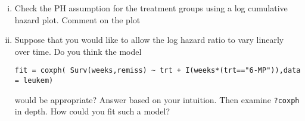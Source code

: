 \begin{enumerate}[(a)]
\begin{enumerate}[(i)]
\item Check the PH assumption for the treatment groups using a log cumulative hazard plot. Comment on the plot
\item Suppose that you would like to allow the log hazard ratio to vary linearly over time. Do you think the model
\begin{small}
\begin{verbatim}
fit = coxph( Surv(weeks,remiss) ~ trt + I(weeks*(trt=="6-MP")),data = leukem)
\end{verbatim}
\end{small}
would be appropriate? Answer based on your intuition. Then examine \verb|?coxph| in depth. How could you fit such a model? 
\end{enumerate} 
\end{enumerate}

